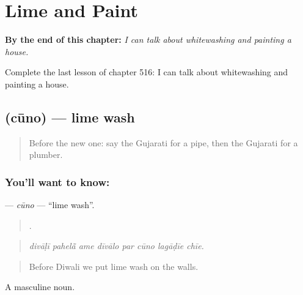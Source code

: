 
\chapter{Lime and Paint}
\label{ch:gu-lime-and-paint}

\begin{chapteropening}
\textbf{By the end of this chapter:} \emph{I can talk about whitewashing and painting a house.}

Complete the last lesson of chapter 516: I can talk about whitewashing and painting a house.
\end{chapteropening}

\section[\texorpdfstring{\gu{ચૂનો} (cūno)}{ચૂનો (cūno)}]{ (cūno) — lime wash}

\label{lesson:GU-C516-cuno}



\begin{quote}
Before the new one: say the Gujarati for a pipe, then the Gujarati for a plumber.
\end{quote}

\subsection*{You'll want to know: }
\textbf{} — \emph{cūno} — \textquotedblleft{}lime wash\textquotedblright{}.

\begin{quote}
       .
\end{quote}

\begin{quote}
\emph{divāḷī pahelā̃ ame dīvālo par cūno lagāḍīe chīe.}
\end{quote}

\begin{quote}
Before Diwali we put lime wash on the walls.
\end{quote}

A masculine noun.

